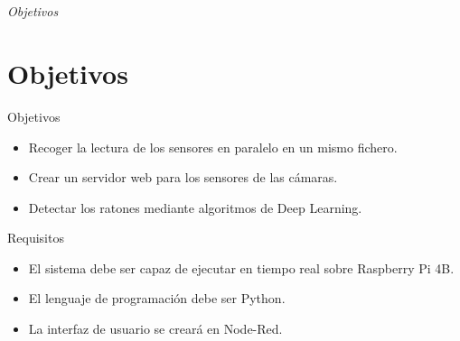 \documentclass{beamer}
\begin{document}
\section*{}
\begin{frame}{}
  \centering \Huge
  \emph{Objetivos}
\end{frame}



\section{Objetivos}
\begin{frame}
\begin{block}{Objetivos}
\begin{itemize}
\item Recoger la lectura de los sensores en paralelo en un mismo fichero.
\item Crear un servidor web para los sensores de las cámaras.
\item Detectar los ratones mediante algoritmos de Deep Learning.
\end{itemize}
\end{block}

\begin{block}{Requisitos}
\begin{itemize}
\item El sistema debe ser capaz de ejecutar en tiempo real sobre Raspberry Pi 4B.
\item El lenguaje de programación debe ser Python.
\item La interfaz de usuario se creará en Node-Red.
\end{itemize}
\end{block}
\end{frame}
\end{document}
